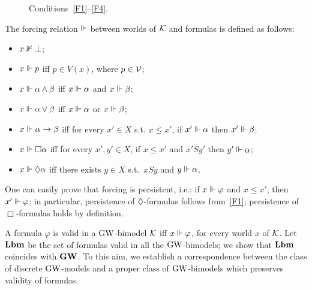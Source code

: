 \begin{figure}[t]
\begin{minipage}{11em}
  \end{minipage}
  
  
  \caption{Conditions~\ref{F1}--\ref{F4}.}\label{fig:F}
\end{figure}



%
%


\noindent
The forcing relation $\Vdash$ between worlds of $\mathcal{K}$ and formulas is
defined as follows:
\begin{itemize}
\item $x\nVdash \bot$;
\item $x\Vdash p$  iff  $p \in V(x)$, where $p\in\mathcal{V}$;
\item $x\Vdash \alpha \land \beta$ iff $x \Vdash \alpha$ and $x \Vdash \beta$;
\item $x\Vdash \alpha \lor \beta$ iff $x \Vdash \alpha$ or $x \Vdash \beta$;
\item $x\Vdash \alpha \to \beta$ iff for every $x'\in X$ s.t.  $x\leq x'$, if
  $x' \Vdash \alpha$ then $x' \Vdash \beta$;
\item $x\Vdash \Box\alpha $ iff for every $x',y'\in X$, if $x \leq x'$ and  $x' S y'$  then
  $y'\Vdash \alpha$;
\item $x\Vdash \lozenge\alpha $ iff there exists $y\in X$ s.t.~$x S y$ and
  $y \Vdash \alpha$.
\end{itemize}
One can easily prove that forcing is persistent, i.e.: if $x\Vdash
\varphi$ and $x\leq x'$, then $x'\Vdash\varphi$; in particular,
persistence of $\lozenge$-formulas follows from~\ref{F1};
persistence of $\Box$-formulas holds by definition.





A formula $\varphi$ is valid in a $\mbox{$\mathrm{GW}$}$-bimodel $\mathcal{K}$ iff $x\Vdash
\varphi$, for every world $x$ of $\mathcal{K}$.  Let $\mathbf{Lbm}$ be
the set of formulas valid in all the $\mbox{$\mathrm{GW}$}$-bimodels; we show that
$\mathbf{Lbm}$ coincides with $\mathbf{GW}$.
To this aim, we establish
a correspondence between the class of discrete $\mbox{$\mathrm{GW}$}$-models and a proper class
of $\mbox{$\mathrm{GW}$}$-bimodels which preserves validity of formulas.



